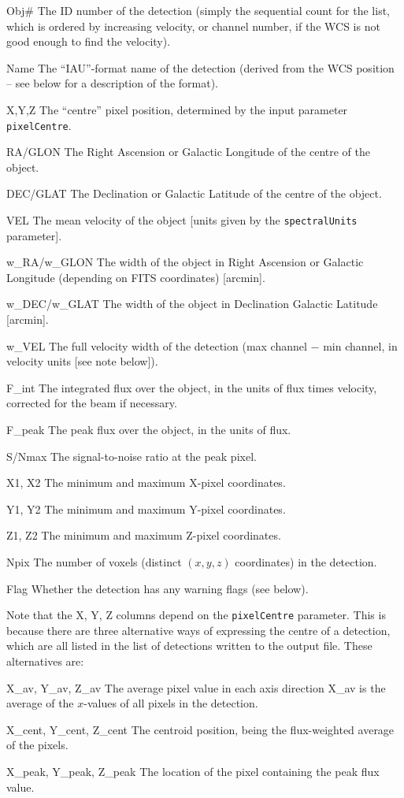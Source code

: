 \begin{entry}
\item[Obj\#] The ID number of the detection (simply the sequential
  count for the list, which is ordered by increasing velocity, or
  channel number, if the WCS is not good enough to find the velocity).
\item[Name] The ``IAU''-format name of the detection (derived from the
  WCS position -- see below for a description of the format).
\item[X,Y,Z] The ``centre'' pixel position, determined by the input
  parameter \texttt{pixelCentre}.
\item[RA/GLON] The Right Ascension or Galactic Longitude of the centre
  of the object.
\item[DEC/GLAT] The Declination or Galactic Latitude of the centre of
  the object.
\item[VEL] The mean velocity of the object [units given by the
  \texttt{spectralUnits} parameter].
\item[w\_RA/w\_GLON] The width of the object in Right Ascension or
  Galactic Longitude (depending on FITS coordinates) [arcmin].
\item[w\_DEC/w\_GLAT] The width of the object in Declination Galactic
  Latitude [arcmin].
\item[w\_VEL] The full velocity width of the detection (max channel
  $-$ min channel, in velocity units [see note below]).
\item[F\_int] The integrated flux over the object, in the units of
  flux times velocity, corrected for the beam if necessary.
\item[F\_peak] The peak flux over the object, in the units of flux.
\item[S/Nmax] The signal-to-noise ratio at the peak pixel.
\item[X1, X2] The minimum and maximum X-pixel coordinates.
\item[Y1, Y2] The minimum and maximum Y-pixel coordinates.
\item[Z1, Z2] The minimum and maximum Z-pixel coordinates.
\item[Npix] The number of voxels (\ie distinct $(x,y,z)$ coordinates)
  in the detection.
\item[Flag] Whether the detection has any warning flags (see below).
\end{entry}

Note that the X, Y, Z columns depend on the \texttt{pixelCentre}
parameter. This is because there are three alternative ways of
expressing the centre of a detection, which are all listed in the list
of detections written to the output file. These alternatives are:
\begin{entry}
\item[X\_av, Y\_av, Z\_av] The average pixel value in each axis
  direction \ie X\_av is the average of the $x$-values of all pixels
  in the detection.
\item[X\_cent, Y\_cent, Z\_cent] The centroid position, being the
  flux-weighted average of the pixels.
\item[X\_peak, Y\_peak, Z\_peak] The location of the pixel containing
  the peak flux value.
\end{entry}

